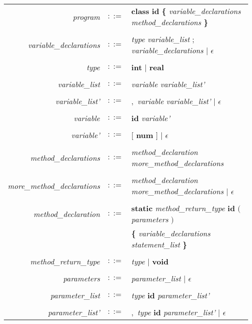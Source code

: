 \documentclass{article}
\begin{document}
\newcommand{\token}[1]
{ \textbf{#1} }

\newcommand{\nont}[1]
{ \emph{#1} }

\newcommand{\lnont}[1]
{ \\
\emph{#1} & $::=$ &
}

\begin{tabular}{r l l}

	\lnont{program} \token{class} \token{id}  \token{\{}  \nont{variable\_declarations} \nont{method\_declarations} \token{\}} \\

	\lnont{variable\_declarations} \nont{type} \nont{variable\_list} \token{$;$} \nont{variable\_declarations} $|$ $\epsilon$ \\

	\lnont{type}  \token{int} $|$ \token{real} \\

	\lnont{variable\_list} \nont{variable} \nont{variable\_list'} \\

	\lnont{variable\_list'} \token{$,$} \nont{variable} \nont{variable\_list'} $|$ $\epsilon$ \\

	\lnont{variable} \token{id} \nont{variable'} \\
	\lnont{variable'} \token{$[$} \token{num} \token{$]$} $|$ $\epsilon$ \\

	\lnont{method\_declarations}  \nont{method\_declaration} \nont{more\_method\_declarations} \\

	\lnont{more\_method\_declarations} \nont{method\_declaration} \nont{more\_method\_declarations} $|$ $\epsilon$ \\

	\lnont{method\_declaration} \token{static} \nont{method\_return\_type} \token{id} \token{$($} \nont{parameters} \token{$)$} \\
	& &  \token{\{}  \nont{variable\_declarations} \nont{statement\_list} \token{\}} \\

	\lnont{method\_return\_type} \nont{type} $|$ \token{void} \\

	\lnont{parameters} \nont{parameter\_list} $|$ $\epsilon$ \\

	\lnont{parameter\_list} \nont{type} \token{id} \nont{parameter\_list'}  \\
	\lnont{parameter\_list'} \token{$,$} \nont{type} \token{id} \nont{parameter\_list'} $|$ $\epsilon$  \\


\end{tabular}
\end{document}
